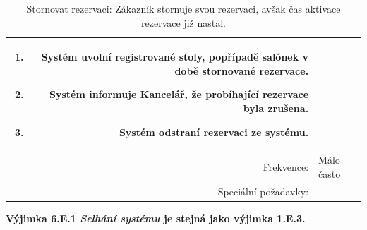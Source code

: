 \documentclass[a4paper,10pt]{article}
\begin{document}
\begin{table}[ht!]
{\begin{tabular}{| r | p{12cm} |}
\begin{minipage}[t]{0.75\textwidth}
\begin{enumerate}[nosep,after=\strut]
            \item Systém uvolní registrované stoly, popřípadě salónek v době stornované rezervace.
            \item Systém informuje Kancelář, že probíhající rezervace byla zrušena.
            \item Systém odstraní rezervaci ze systému. 
    	\end{enumerate}
    \end{minipage} \\
    \hline
    Frekvence: & Málo často \\
    \hline
    Speciální požadavky: & \\  
        \hline

\end{tabular}}
\caption{Stornovat rezervaci: Zákazník stornuje svou rezervaci, avšak čas aktivace rezervace již nastal.}
\label{table:2}
\end{table}

\textbf{Výjimka 6.E.1 \textit{Selhání systému} je stejná jako výjimka 1.E.3.}
\newpage





\newpage
\begin{landscape}	
\end{landscape}

\newpage
\end{document}
